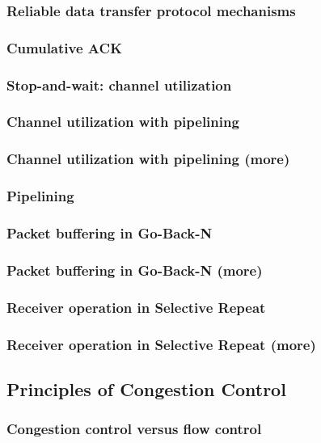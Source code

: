     \subsubsection*{Reliable data transfer protocol mechanisms}
    \subsubsection*{Cumulative ACK}
    \subsubsection*{Stop-and-wait: channel utilization}
    \subsubsection*{Channel utilization with pipelining}
    \subsubsection*{Channel utilization with pipelining (more)}
    \subsubsection*{Pipelining}
    \subsubsection*{Packet buffering in Go-Back-N}
    \subsubsection*{Packet buffering in Go-Back-N (more)}
    \subsubsection*{Receiver operation in Selective Repeat}
    \subsubsection*{Receiver operation in Selective Repeat (more)}

\subsection*{Principles of Congestion Control}
    \subsubsection*{Congestion control versus flow control}
